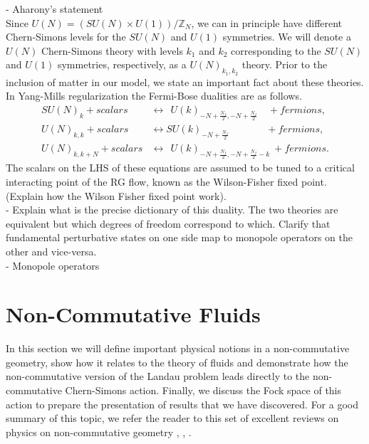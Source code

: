             - Aharony's statement\\
            Since $U(N) = (SU(N)\times U(1))/\mathbb{Z}_N$, we can in principle have different Chern-Simons levels for the $SU(N)$ and $U(1)$ symmetries. We will denote a $U(N)$ Chern-Simons theory with levels $k_1$ and $k_2$ corresponding to the $SU(N)$ and $U(1)$ symmetries, respectively, as a $U(N)_{k_1,k_2}$ theory. Prior to the inclusion of matter in our model, we state an important fact about these theories. In Yang-Mills regularization the Fermi-Bose dualities are as follows\cite{1512.00161}.
            \begin{align}
                SU(N)_k + scalars &\longleftrightarrow \ \ U(k)_{-N +\frac{N_f}{2}, -N + \frac{N_f}{2}} \quad + fermions,  \\
                U(N)_{k,k} + scalars &\longleftrightarrow SU(k)_{-N +\frac{N_f}{2}}\qquad \ \ \ \quad+ fermions,  \\
                U(N)_{k,k+N} + scalars &\longleftrightarrow \ \ U(k)_{-N +\frac{N_f}{2}, -N + \frac{N_f}{2}-k} \ + fermions.  
            \end{align}
            The scalars on the LHS of these equations are assumed to be tuned to a critical interacting point of the RG flow, known as the Wilson-Fisher fixed point. (Explain how the Wilson Fisher fixed point work).\\
            - Explain what is the precise dictionary of this duality. The two theories are equivalent but which degrees of freedom correspond to which. Clarify that fundamental perturbative states on one side map to monopole operators on the other and vice-versa.\\
            - Monopole operators

        \section{Non-Commutative Fluids}
    In this section we will define important physical notions in a non-commutative geometry, show how it relates to the theory of fluids and demonstrate how the non-commutative version of the Landau problem leads directly to the non-commutative Chern-Simons action. Finally, we discuss the Fock space of this action to prepare the presentation of results that we have discovered. For a good summary of this topic, we refer the reader to this set of excellent reviews on physics on non-commutative geometry \cite{0706.1095}, \cite{hep-th/0106048}, \cite{hep-th/0109162}.

